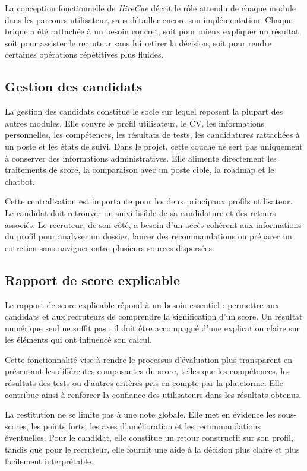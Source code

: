 La conception fonctionnelle de \textit{HireCue} décrit le rôle attendu de chaque module dans les parcours utilisateur, sans détailler encore son implémentation. Chaque brique a été rattachée à un besoin concret, soit pour mieux expliquer un résultat, soit pour assister le recruteur sans lui retirer la décision, soit pour rendre certaines opérations répétitives plus fluides.

\subsection{Gestion des candidats}

La gestion des candidats constitue le socle sur lequel reposent la plupart des autres modules. Elle couvre le profil utilisateur, le CV, les informations personnelles, les compétences, les résultats de tests, les candidatures rattachées à un poste et les états de suivi. Dans le projet, cette couche ne sert pas uniquement à conserver des informations administratives. Elle alimente directement les traitements de score, la comparaison avec un poste cible, la roadmap et le chatbot.

Cette centralisation est importante pour les deux principaux profils utilisateur. Le candidat doit retrouver un suivi lisible de sa candidature et des retours associés. Le recruteur, de son côté, a besoin d'un accès cohérent aux informations du profil pour analyser un dossier, lancer des recommandations ou préparer un entretien sans naviguer entre plusieurs sources dispersées.

\subsection{Rapport de score explicable}

Le rapport de score explicable répond à un besoin essentiel : permettre aux candidats et aux recruteurs de comprendre la signification d'un score. Un résultat numérique seul ne suffit pas ; il doit être accompagné d'une explication claire sur les éléments qui ont influencé son calcul.

Cette fonctionnalité vise à rendre le processus d'évaluation plus transparent en présentant les différentes composantes du score, telles que les compétences, les résultats des tests ou d'autres critères pris en compte par la plateforme. Elle contribue ainsi à renforcer la confiance des utilisateurs dans les résultats obtenus.

La restitution ne se limite pas à une note globale. Elle met en évidence les sous-scores, les points forts, les axes d'amélioration et les recommandations éventuelles. Pour le candidat, elle constitue un retour constructif sur son profil, tandis que pour le recruteur, elle fournit une aide à la décision plus claire et plus facilement interprétable.

